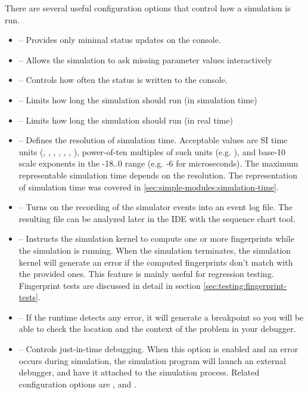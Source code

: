 There are several useful configuration options that control how a simulation is run.

\begin{itemize}
  \item {} -- Provides only minimal status updates on the console.
  \item {} -- Allows the simulation to ask missing parameter values interactively
  \item {} -- Controls how often the status is written to the console.
  \item {} -- Limits how long the simulation should run (in simulation time)
  \item {} -- Limits how long the simulation should run (in real time)
  \item {} -- Defines the resolution of simulation time. Acceptable
          values are SI time units (, , , , , ,
          ), power-of-ten multiples of such units (e.g. ), and base-10 scale
          exponents in the -18..0 range (e.g. -6 for microseconds). The maximum representable
          simulation time depends on the resolution. The representation of simulation time was
          covered in \ref{sec:simple-modules:simulation-time}.
  \item {} -- Turns on the recording of the simulator events into an event log file.
           The resulting  file can be analyzed later in the IDE with the sequence chart tool.
  \item {} -- Instructs the simulation kernel to compute one or more fingerprints while
          the simulation is running. When the simulation terminates, the simulation kernel will generate an
          error if the computed fingerprints don't match with the provided ones. This feature is mainly
          useful for regression testing. Fingerprint tests are discussed in detail in section
          \ref{sec:testing:fingerprint-tests}.
  \item {} -- If the runtime detects any error, it will generate a breakpoint
          so you will be able to check the location and the context of the problem in your debugger.
  \item {} -- Controls just-in-time debugging. When this option is enabled
          and an error occurs during simulation, the simulation program will launch an external debugger,
          and have it attached to the simulation process. Related configuration options are
          ,  and
          .
\end{itemize}

